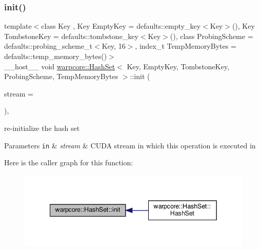 \subsubsection{\texorpdfstring{init()}{init()}}
{\footnotesize\ttfamily template$<$class Key , Key Empty\+Key = defaults\+::empty\+\_\+key$<$\+Key$>$(), Key Tombstone\+Key = defaults\+::tombstone\+\_\+key$<$\+Key$>$(), class Probing\+Scheme  = defaults\+::probing\+\_\+scheme\+\_\+t$<$\+Key, 16$>$, index\+\_\+t Temp\+Memory\+Bytes = defaults\+::temp\+\_\+memory\+\_\+bytes()$>$ \\
\+\_\+\+\_\+host\+\_\+\+\_\+ void \hyperlink{classwarpcore_1_1HashSet}{warpcore\+::\+Hash\+Set}$<$ Key, Empty\+Key, Tombstone\+Key, Probing\+Scheme, Temp\+Memory\+Bytes $>$\+::init (\begin{DoxyParamCaption}\item[{cuda\+Stream\+\_\+t}]{stream = {} }\end{DoxyParamCaption})\hspace{0.3cm}{\ttfamily [inline]}, {\ttfamily [noexcept]}}



re-\/initialize the hash set 


\begin{DoxyParams}[1]{Parameters}
\mbox{\tt in}  & {\em stream} & C\+U\+DA stream in which this operation is executed in \\
\hline
\end{DoxyParams}
Here is the caller graph for this function\+:
\nopagebreak
\begin{figure}[H]
\begin{center}
\leavevmode
\includegraphics[width=342pt]{classwarpcore_1_1HashSet_a3768b1e7daa39cff5bc2bcac38d51b2e_icgraph}
\end{center}
\end{figure}
\mbox{\label{classwarpcore_1_1HashSet_af54d9aecfefb13e451e0580a38702f54}} 
